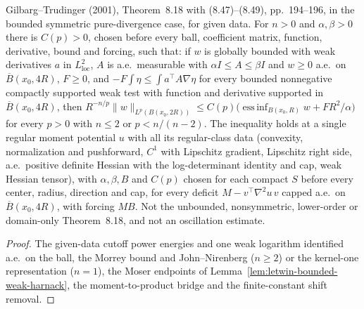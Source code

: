 \begin{lemma}
  \label{lem:given-data-weak-harnack}
  \leanok
  Gilbarg--Trudinger (2001), Theorem~8.18 with (8.47)--(8.49), pp.~194--196, in the bounded symmetric pure-divergence case, for
  given data. For $n>0$ and $\alpha,\beta>0$ there is $C(p)>0$, chosen before every ball, coefficient matrix, function,
  derivative, bound and forcing, such that: if $w$ is globally bounded with weak derivatives $a$ in $L^2_{\mathrm{loc}}$, $A$ is
  a.e.\ measurable with $\alpha I\le A\le\beta I$ and $w\ge0$ a.e.\ on $\overline B(x_0,4R)$, $F\ge0$, and
  $-F\int\eta\le\int a^{\top}A\nabla\eta$ for every bounded nonnegative compactly supported weak test with function and
  derivative supported in $\overline B(x_0,4R)$, then
  $R^{-n/p}\|w\|_{L^p(B(x_0,2R))}\le C(p)\bigl(\operatorname{ess\,inf}_{B(x_0,R)}w+FR^2/\alpha\bigr)$ for every $p>0$ with
  $n\le2$ or $p<n/(n-2)$. The inequality holds at a single regular moment potential $u$ with all its regular-class data (convexity,
  normalization and pushforward, $C^1$ with Lipschitz gradient, Lipschitz right side, a.e.\ positive definite Hessian with the
  log-determinant identity and cap, weak Hessian tensor), with $\alpha,\beta,B$ and $C(p)$ chosen for each compact $S$
  before every center, radius, direction and cap, for every deficit $M-v^{\top}\nabla^2u\,v$ capped a.e.\ on
  $\overline B(x_0,4R)$, with forcing $MB$. Not the unbounded, nonsymmetric, lower-order or domain-only Theorem~8.18, and not an
  oscillation estimate.
\end{lemma}
\begin{proof}
  \leanok
  The given-data cutoff power energies and one weak logarithm identified a.e.\ on the ball, the Morrey bound and
  John--Nirenberg ($n\ge2$) or the kernel-one representation ($n=1$), the Moser endpoints of
  Lemma~\ref{lem:letwin-bounded-weak-harnack}, the moment-to-product bridge and the finite-constant shift removal.
\end{proof}

